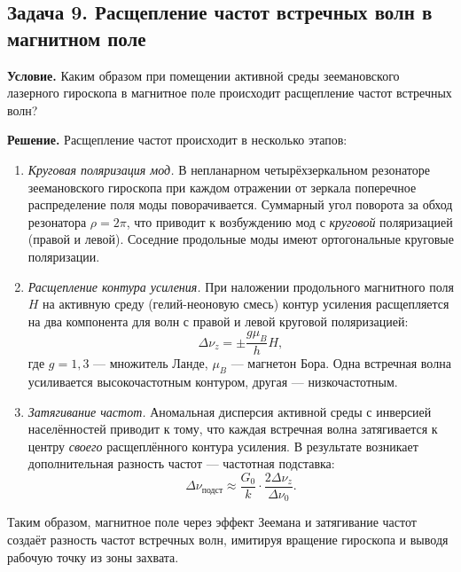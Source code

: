 \documentclass[12pt, a4paper]{article}
\begin{document}
\subsection*{Задача 9. Расщепление частот встречных волн в магнитном поле}

\textbf{Условие.} Каким образом при помещении активной среды зеемановского лазерного гироскопа в магнитное поле происходит расщепление частот встречных волн?

\textbf{Решение.} Расщепление частот происходит в несколько этапов:

\begin{enumerate}[leftmargin=1.5em]
    \item \textit{Круговая поляризация мод.} В непланарном четырёхзеркальном резонаторе зеемановского гироскопа при каждом отражении от зеркала поперечное распределение поля моды поворачивается. Суммарный угол поворота за обход резонатора $\rho = 2\pi$, что приводит к возбуждению мод с \textit{круговой} поляризацией (правой и левой). Соседние продольные моды имеют ортогональные круговые поляризации.
    
    \item \textit{Расщепление контура усиления.} При наложении продольного магнитного поля $H$ на активную среду (гелий-неоновую смесь) контур усиления расщепляется на два компонента для волн с правой и левой круговой поляризацией:
    \begin{equation}
        \Delta \nu_z = \pm \frac{g \mu_B}{h} H,
    \end{equation}
    где $g = 1{,}3$ --- множитель Ланде, $\mu_B$ --- магнетон Бора. Одна встречная волна усиливается высокочастотным контуром, другая --- низкочастотным.
    
    \item \textit{Затягивание частот.} Аномальная дисперсия активной среды с инверсией населённостей приводит к тому, что каждая встречная волна затягивается к центру \textit{своего} расщеплённого контура усиления. В результате возникает дополнительная разность частот --- частотная подставка:
    \begin{equation}
        \Delta \nu_{\text{подст}} \approx \frac{G_0}{k} \cdot \frac{2 \Delta \nu_z}{\Delta \nu_0}.
    \end{equation}
\end{enumerate}

Таким образом, магнитное поле через эффект Зеемана и затягивание частот создаёт разность частот встречных волн, имитируя вращение гироскопа и выводя рабочую точку из зоны захвата.
\end{document}
